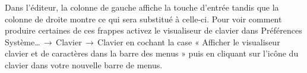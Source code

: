 \documentclass[11pt,french]{article}
\newcommand{\mnu}[1]{\textsf{#1}}
\newcommand{\To}{\,\(\to\)\,}
\begin{document}
Dans l'éditeur, la colonne de gauche affiche la touche d'entrée tandis que la colonne de droite montre ce qui sera substitué à celle-ci. Pour voir comment produire certaines de ces frappes activez le visualiseur de clavier dans \mnu{Préférences Système…}\To\mnu{Clavier}\To\mnu{Clavier} en cochant la case « \mnu{Afficher le visualiseur clavier et de caractères dans la barre des menus} » puis en cliquant sur l'icône du clavier dans votre nouvelle barre de menus.



\begin{figure}
\begin{floatrow}
%
\end{floatrow}
\end{figure}
\end{document}
